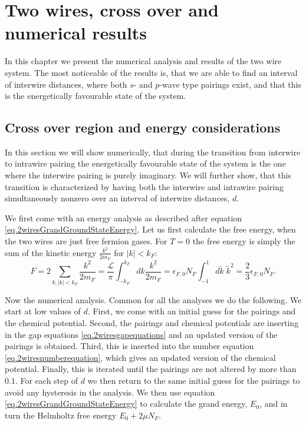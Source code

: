 
\chapter{Two wires, cross over and numerical results} %

\label{Chapter10} %


In this chapter we present the numerical analysis and results of the two wire system. The most noticeable of the results is, that we are able to find an interval of interwire distances, where both $s$- and $p$-wave type pairings exist, and that this is the energetically favourable state of the system.

\section{Cross over region and energy considerations}
In this section we will show numerically, that during the transition from interwire to intrawire pairing the energetically favourable state of the system is the one where the interwire pairing is purely imaginary. We will further show, that this transition is characterized by having both the interwire and intrawire pairing simultaneously nonzero over an interval of interwire distances, $d$. 

We first come with an energy analysis as described after equation \eqref{eq.2wiresGrandGroundStateEnergy}. Let us first calculate the free energy, when the two wires are just free fermion gases. For $T = 0$ the free energy is simply the sum of the kinetic energy $\frac{k^2}{2m_F}$ for $|k| < k_F$: 
\begin{equation}
F = 2\sum_{k, |k| < k_F} \frac{k^2}{2m_F} = \frac{\mathcal{L}}{\pi} \int^{k_F}_{-k_F} dk \frac{k^2}{2m_F} = \epsilon_{F,0} N_F \int^{1}_{-1} d\tilde{k}\; \tilde{k}^2 = \frac{2}{3}\epsilon_{F,0} N_F. 
\end{equation}

Now the numerical analysis. Common for all the analyses we do the following. We start at low values of $d$. First, we come with an initial guess for the pairings and the chemical potential. Second, the pairings and chemical potentials are inserting in the gap equations \ref{eq.2wiresgapequations} and an updated version of the pairings is obtained. Third, this is inserted into the number equation \ref{eq.2wiresnumberequation}, which gives an updated version of the chemical potential. Finally, this is iterated until the pairings are not altered by more than $0.1$\textperthousand. For each step of $d$ we then return to the same initial guess for the pairings to avoid any hysteresis in the analysis. We then use equation \eqref{eq.2wiresGrandGroundStateEnergy} to calculate the grand energy, $E_0$, and in turn the Helmholtz free energy $E_0 + 2\mu N_F$.  

